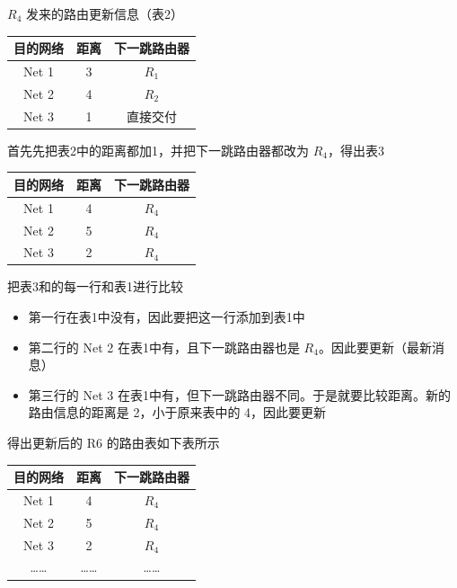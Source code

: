 \documentclass[cs4size,a4paper,10pt]{ctexart}
\begin{document}
	$R_4$ 发来的路由更新信息（表2）
	\begin{table}[H]
		\centering
		\begin{tabular}{|c|c|c|}
		\hline
		目的网络  & 距离 & 下一跳路由器 \\ \hline
		Net 1 & 3  & $R_1$  \\ \hline
		Net 2 & 4  & $R_2$  \\ \hline
		Net 3 & 1  & 直接交付   \\ \hline
		\end{tabular}
	\end{table}

	首先先把表2中的距离都加1，并把下一跳路由器都改为 $R_4$，得出表3
	\begin{table}[H]
		\centering
		\begin{tabular}{|c|c|c|}
		\hline
		目的网络  & 距离 & 下一跳路由器 \\ \hline
		Net 1 & 4  & $R_4$  \\ \hline
		Net 2 & 5  & $R_4$  \\ \hline
		Net 3 & 2  & $R_4$  \\ \hline
		\end{tabular}
	\end{table}

	把表3和的每一行和表1进行比较
	\begin{itemize}
		\item 第一行在表1中没有，因此要把这一行添加到表1中
		\item 第二行的 Net 2 在表1中有，且下一跳路由器也是 $R_4$。因此要更新（最新消息）
		\item 第三行的 Net 3 在表1中有，但下一跳路由器不同。于是就要比较距离。新的路由信息的距离是 2，小于原来表中的 4，因此要更新
	\end{itemize}

	得出更新后的 R6 的路由表如下表所示
	\begin{table}[H]
		\centering
		\begin{tabular}{|c|c|c|}
		\hline
		目的网络  & 距离 & 下一跳路由器 \\ \hline
		Net 1 & 4  & $R_4$  \\ \hline
		Net 2 & 5  & $R_4$  \\ \hline
		Net 3 & 2  & $R_4$  \\ \hline
		……    & …… & ……     \\ \hline
		\end{tabular}
	\end{table}
\end{document}
